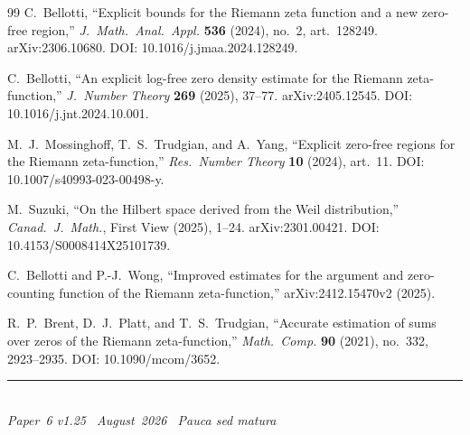 \documentclass[11pt]{article}
\begin{document}
\begin{thebibliography}{99}
C.~Bellotti,
``Explicit bounds for the Riemann zeta function and a new
zero-free region,''
\textit{J.\ Math.\ Anal.\ Appl.} \textbf{536} (2024),
no.~2, art.~128249.
arXiv:2306.10680.
DOI: 10.1016/j.jmaa.2024.128249.

C.~Bellotti,
``An explicit log-free zero density estimate for the Riemann
zeta-function,''
\textit{J.\ Number Theory} \textbf{269} (2025), 37--77.
arXiv:2405.12545.
DOI: 10.1016/j.jnt.2024.10.001.

M.~J.~Mossinghoff, T.~S.~Trudgian, and A.~Yang,
``Explicit zero-free regions for the Riemann zeta-function,''
\textit{Res.\ Number Theory} \textbf{10} (2024), art.~11.
DOI: 10.1007/s40993-023-00498-y.

M.~Suzuki,
``On the Hilbert space derived from the Weil distribution,''
\textit{Canad.\ J.\ Math.}, First View (2025), 1--24.
arXiv:2301.00421.
DOI: 10.4153/S0008414X25101739.

C.~Bellotti and P.-J.~Wong,
``Improved estimates for the argument and zero-counting function
of the Riemann zeta-function,''
arXiv:2412.15470v2 (2025).

R.~P.~Brent, D.~J.~Platt, and T.~S.~Trudgian,
``Accurate estimation of sums over zeros of the Riemann
zeta-function,''
\textit{Math.\ Comp.} \textbf{90} (2021), no.~332, 2923--2935.
DOI: 10.1090/mcom/3652.
\end{thebibliography}

\enlargethispage{3\baselineskip}
\vspace*{\fill}
\begin{minipage}{\linewidth}
\rule{\linewidth}{0.4pt}\smallskip\\
\small\emph{Paper~6 v1.25 \textperiodcentered\ August~2026
\textperiodcentered\ Pauca sed matura}
\end{minipage}
\end{document}
